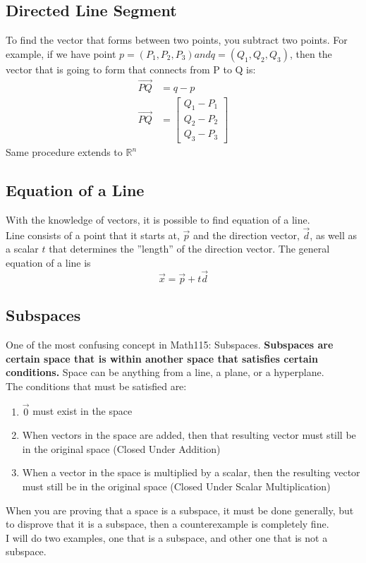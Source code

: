 \documentclass[12pt]{article}
\newcommand{\R}{\mathbb{R}}
\begin{document}
\subsection{Directed Line Segment}
To find the vector that forms between two points, you subtract two points. For example, if we have point $p = (P_1,P_2,P_3) and q = (Q_1,Q_2,Q_3)$, then the vector that is going to form that connects from P to Q is: \\
\begin{equation}
\begin{split}
\vec{PQ} &= q - p\\
\vec{PQ} &= \begin{bmatrix}Q_1-P_1\\Q_2-P_2\\Q_3-P_3\end{bmatrix}
\end{split}
\end{equation}
Same procedure extends to $\R^n$

\subsection{Equation of a Line}
With the knowledge of vectors, it is possible to find equation of a line. \\
Line consists of a point that it starts at, $\vec{p}$ and the direction vector, $\vec{d}$, as well as a scalar $t$ that determines the ''length'' of the direction vector.
The general equation of a line is
\begin{equation}
\vec{x} = \vec{p} + t\vec{d}
\end{equation}

\subsection{Subspaces}
One of the most confusing concept in Math115: Subspaces. 
\textbf{Subspaces are certain space that is within another space that satisfies certain conditions.}
Space can be anything from a line, a plane, or a hyperplane. \\
The conditions that must be satisfied are:
\begin{enumerate}
  \item $\vec{0}$ must exist in the space
  \item When vectors in the space are added, then that resulting vector must still be in the original space (Closed Under Addition)
  \item When a vector in the space is multiplied by a scalar, then the resulting vector must still be in the original space (Closed Under Scalar Multiplication)
\end{enumerate}
When you are proving that a space is a subspace, it must be done generally, but to disprove that it is a subspace, then a counterexample is completely fine.\\
I will do two examples, one that is a subspace, and other one that is not a subspace.
\end{document}
